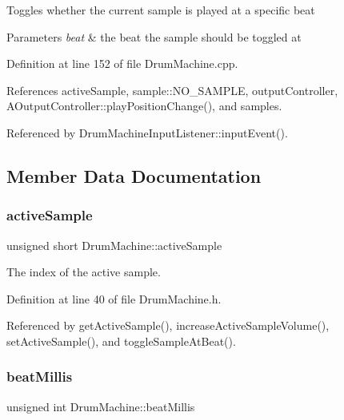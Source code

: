 Toggles whether the current sample is played at a specific beat 
\begin{DoxyParams}{Parameters}
{\em beat} & the beat the sample should be toggled at \\
\hline
\end{DoxyParams}


Definition at line 152 of file Drum\+Machine.\+cpp.



References active\+Sample, sample\+::\+N\+O\+\_\+\+S\+A\+M\+P\+LE, output\+Controller, A\+Output\+Controller\+::play\+Position\+Change(), and samples.



Referenced by Drum\+Machine\+Input\+Listener\+::input\+Event().



\subsection{Member Data Documentation}
\mbox{\label{class_drum_machine_a9e12916e5724251791689e6f14c8513a}} 
\subsubsection{\texorpdfstring{active\+Sample}{activeSample}}
{\footnotesize\ttfamily unsigned short Drum\+Machine\+::active\+Sample\hspace{0.3cm}{\ttfamily [private]}}



The index of the active sample. 



Definition at line 40 of file Drum\+Machine.\+h.



Referenced by get\+Active\+Sample(), increase\+Active\+Sample\+Volume(), set\+Active\+Sample(), and toggle\+Sample\+At\+Beat().

\mbox{\label{class_drum_machine_a91179ac48de4159d04052291ad25fa02}} 
\subsubsection{\texorpdfstring{beat\+Millis}{beatMillis}}
{\footnotesize\ttfamily unsigned int Drum\+Machine\+::beat\+Millis\hspace{0.3cm}{\ttfamily [private]}}



